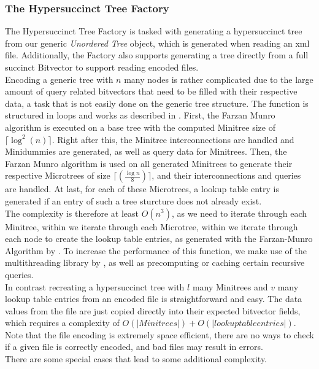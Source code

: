\documentclass{article}
\begin{document}
\subsubsection{The Hypersuccinct Tree Factory} \label{The Hypersuccinct Tree Factory}
The Hypersuccinct Tree Factory is tasked with generating a hypersuccinct tree from our generic \textit{Unordered Tree} object, which is generated when reading an xml file. Additionally, the Factory also supports generating a tree directly from a full succinct Bitvector to support reading encoded files.\\
Encoding a generic tree with $n$ many nodes is rather complicated due to the large amount of query related bitvectors that need to be filled with their respective data, a task that is not easily done on the generic tree structure. The function is structured in loops and works as described in \cite{farzanMunro}. First, the Farzan Munro algorithm is executed on a base tree with the computed Minitree size of $\lceil \log^2( n ) \rceil$. Right after this, the Minitree interconnections are handled and Minidummies are generated, as well as query data for Minitrees. Then, the Farzan Munro algorithm is used on all generated Minitrees to generate their respective Microtrees of size $\lceil ( \frac{\log n}{8} ) \rceil$, and their interconnections and queries are handled. At last, for each of these Microtrees, a lookup table entry is generated if an entry of such a tree sturcture does not already exist.\\
The complexity is therefore at least $O(n^3)$, as we need to iterate through each Minitree, within we iterate through each Microtree, within we iterate through each node to create the lookup table entries, as generated with the Farzan-Munro Algorithm by \cite{farzanMunro}. To increase the performance of this function, we make use of the multithreading library by \cite{threading}, as well as precomputing or caching certain recursive queries.\\
In contrast recreating a hypersuccinct tree with $l$ many Minitrees and $v$ many lookup table entries from an encoded file is straightforward and easy. The data values from the file are just copied directly into their expected bitvector fields, which requires a complexity of $O(|Minitrees|) + O(|lookup table entries|)$. Note that the file encoding is extremely space efficient, there are no ways to check if a given file is correctly encoded, and bad files may result in errors.\\
There are some special cases that lead to some additional complexity.
\end{document}
